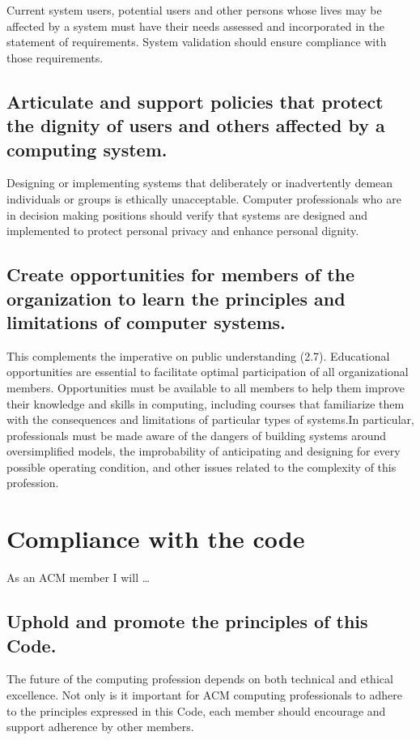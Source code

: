 \documentclass{article}
\begin{document}
Current system users, potential users and other persons whose lives may be
affected by a system must have their needs assessed and incorporated in the
statement of requirements. System validation should ensure compliance with
those requirements.

\subsection{Articulate and support policies that protect the dignity of users
and others affected by a computing system.}

Designing or implementing systems that deliberately or inadvertently demean
individuals or groups is ethically unacceptable. Computer professionals who are
in decision making positions should verify that systems are designed and
implemented to protect personal privacy and enhance personal dignity.

\subsection{Create opportunities for members of the organization to learn the
principles and limitations of computer systems.}

This complements the imperative on public understanding (2.7). Educational
opportunities are essential to facilitate optimal participation of all
organizational members. Opportunities must be available to all members to help
them improve their knowledge and skills in computing, including courses that
familiarize them with the consequences and limitations of particular types of
systems.In particular, professionals must be made aware of the dangers of
building systems around oversimplified models, the improbability of
anticipating and designing for every possible operating condition, and other
issues related to the complexity of this profession.

\section{Compliance with the code}

As an ACM member I will \ldots

\subsection{Uphold and promote the principles of this Code.}

The future of the computing profession depends on both technical and ethical
excellence. Not only is it important for ACM computing professionals to adhere
to the principles expressed in this Code, each member should encourage and
support adherence by other members.
\end{document}

